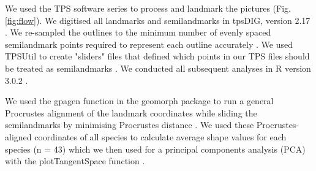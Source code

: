 \documentclass[12pt,a4paper]{article}
\begin{document}

	We used the TPS software series \citep{SUNY2009} to process and landmark the pictures (Fig. \ref{fig:flow}). We digitised all landmarks and semilandmarks in tpsDIG, version 2.17 \citep{Rohlf2013}. We re-sampled the outlines to the minimum number of evenly spaced semilandmark points required to represent each outline accurately \citep[][details in supplementary material]{MacLeod2013}. We used TPSUtil \citep{Rohlf2012} to create "sliders" files that defined which points in our TPS files should be treated as semilandmarks \citep{Zelditch2012}. We conducted all subsequent analyses in R version 3.0.2 \citep[][Fig. \ref{fig:flow}]{Team2014}. 
	
	We used the gpagen function in the geomorph package \citep{Adams2013} to run a general Procrustes alignment \citep{Rohlf1993} of the landmark coordinates while sliding the semilandmarks by minimising Procrustes distance \citep{Bookstein1997}. We used these Procrustes-aligned coordinates of all species to calculate average shape values for each species (n = 43) which we then used for a principal components analysis (PCA) with the plotTangentSpace function \citep{Adams2013}. 
	
\end{document}
